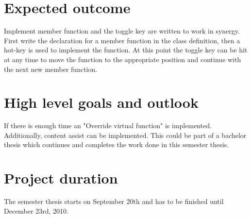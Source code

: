 \section{Expected outcome}

Implement member function and the toggle key are written to work in synergy.
First write the declaration for a member function in the class definition, then
a hot-key is used to implement the function. At this point the toggle key can
be hit at any time to move the function to the appropriate position and
continue with the next new member function.

\section{High level goals and outlook}

If there is enough time an "Override virtual function" is implemented.
Additionally, content assist can be implemented. This could be part of a
bachelor thesis which continues and completes the work done in this semester
thesis.

\section{Project duration}
The semester thesis starts on September 20th and has to be finished until
December 23rd, 2010.